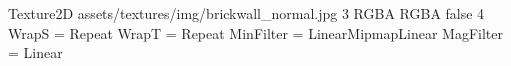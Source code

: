 Texture2D
assets/textures/img/brickwall_normal.jpg
3
RGBA
RGBA
false
4
WrapS = Repeat
WrapT = Repeat
MinFilter = LinearMipmapLinear
MagFilter = Linear